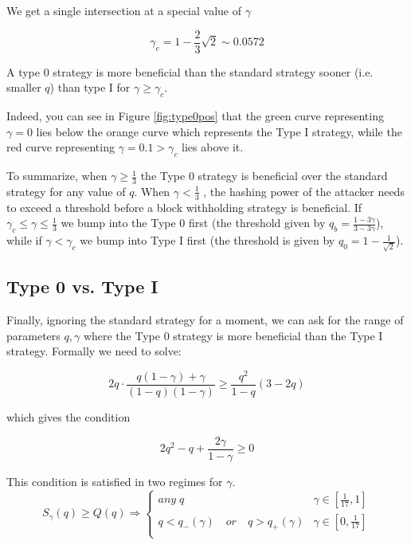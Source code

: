 \documentclass[letterpaper,12pt]{report}
\theoremstyle{plain}
\theoremstyle{definition}
\begin{document}
We get a single intersection at a special value of $\gamma$

\begin{equation}\label{gamma0before1}
\gamma_c=1-\frac{2}{3}\sqrt{2}\sim 0.0572
\end{equation}

A type 0 strategy is more beneficial than the standard strategy sooner (i.e. smaller $q$) than type I for $\gamma \geq\gamma_c$.

Indeed, you can see in Figure \ref{fig:type0pos} that the green curve representing $\gamma=0$ lies below the orange curve which represents the Type I strategy, while the red curve representing $\gamma=0.1>\gamma_c$ lies above it.

To summarize, when $\gamma\geq\frac{1}{3}$ the Type 0 strategy is beneficial over the standard strategy for any value of $q$. When $\gamma<\frac{1}{3}$ , the hashing power of the attacker needs to exceed a threshold before a block withholding strategy is beneficial. If $\gamma_c\leq\gamma\leq\frac{1}{3}$ we bump into the Type 0 first (the threshold given by $q_b=\frac{1-3\gamma}{3-3\gamma}$), while if $\gamma<\gamma_c$ we bump into Type I first (the threshold is given by $q_0=1-\frac{1}{\sqrt{2}}$).

\subsection{Type 0 vs. Type I}

Finally, ignoring the standard strategy for a moment, we can ask for the range of parameters $q,\gamma$ where the Type 0 strategy is more beneficial than the Type I strategy. Formally we need to solve:

\begin{equation}\label{eq:type0overtype1}
2q\cdot\frac{q(1-\gamma)+\gamma}{(1-q)(1-\gamma)}\geq \dfrac{q^2}{1-q}\left(
3-2q
\right)
\end{equation}

which gives the condition

\begin{equation}\label{eq:type0over1condition}
2q^2-q+\frac{2\gamma}{1-\gamma}\geq 0
\end{equation}

This condition is satisfied in two regimes for $\gamma$.
\begin{equation}\label{eq:type0over1gammaregimes}
S_{\gamma}(q)\geq Q(q) \Longrightarrow
\begin{cases}
\mathit{any\;} q & \gamma\in [\frac{1}{17},1] \\ 
q<q_-(\gamma)\quad \mathit{or}\quad q>q_+(\gamma) & \gamma\in [0,\frac{1}{17}] \\ 
\end{cases}
\end{equation}
\end{document}
